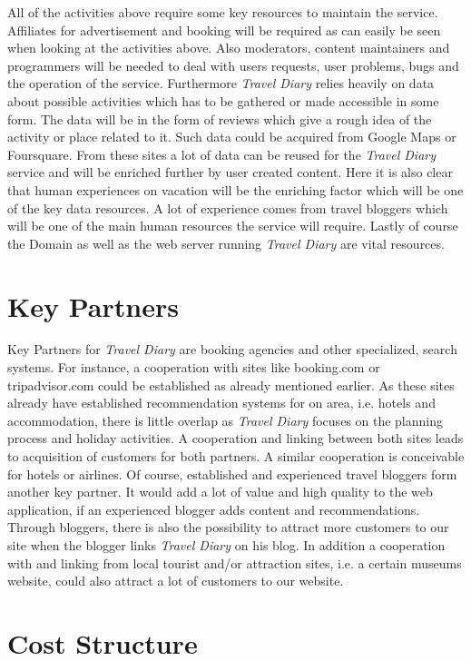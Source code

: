 \documentclass[IN,english]{tumbook}
\begin{document}
All of the activities above require some key resources to maintain the service. Affiliates for advertisement and booking will be required as can easily be seen when looking at the activities above. Also moderators, content maintainers and programmers will be needed to deal with users requests, user problems, bugs and the operation of the service. Furthermore \emph{Travel Diary} relies heavily on data about possible activities which has to be gathered or made accessible in some form. The data will be in the form of reviews which give a rough idea of the activity or place related to it. Such data could be acquired from Google Maps or Foursquare. From these sites a lot of data can be reused for the \emph{Travel Diary} service and will be enriched further by user created content. Here it is also clear that human experiences on vacation will be the enriching factor which will be one of the key data resources. A lot of experience comes from travel bloggers which will be one of the main human resources the service will require. Lastly of course the Domain as well as the web server running \emph{Travel Diary} are vital resources.

\section{Key Partners}

Key Partners for \emph{Travel Diary} are booking agencies and other specialized, search systems. For instance, a cooperation with sites like booking.com or tripadvisor.com could be established as already mentioned earlier. As these sites already have established recommendation systems for on area, i.e. hotels and accommodation, there is little overlap as \emph{Travel Diary} focuses on the planning process and holiday activities. A cooperation and linking between both sites leads to acquisition of customers for both partners. A similar cooperation is conceivable for hotels or airlines. Of course, established and experienced travel bloggers form another key partner. It would add a lot of value and high quality to the web application, if an experienced blogger adds content and recommendations. Through bloggers, there is also the possibility to attract more customers to our site when the blogger links \emph{Travel Diary} on his blog. In addition a cooperation with and linking from local tourist and/or attraction sites, i.e. a certain museums website, could also attract a lot of customers to our website.

\section{Cost Structure}
\end{document}
